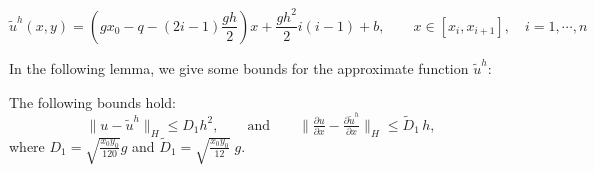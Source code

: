 \documentclass[axioms,article,submit,moreauthors]{Definitions/mdpi}
\newcommand\pder[2][]{\ensuremath{\tfrac{\partial#1}{\partial#2}}}
\begin{document}
\vspace{-12pt}

\centering 
\begin{equation}\label{uhtilde}
{\widetilde{u}^h}(x,y)=\left(gx_0-q-(2i-1)\frac{gh}{2} \right)x+\frac{gh^2}{2} i (i-1)+b,\qquad x\in [x_i,x_{i+1}], \quad i=1,\cdots,n
\end{equation}

In the following lemma, we give some bounds for the approximate  function ${\widetilde{u}^h}:$

 
  \begin{Lemma} \label{Cota u uh tilde} The following  bounds hold:
    		\[\lVert u-{\widetilde{u}^h} \rVert _H \leq  D_1 h^2, \qquad \text{and}\qquad
\lVert \pder[u]{x}-\pder[{\widetilde{u}^h}]{x} \rVert _H \leq \widetilde{D}_{1}\, h, \]
    		where $D_1=\sqrt{\frac{x_0 y_0 }{120}} g $ 
   and $\widetilde{D}_1=\sqrt{\frac{x_0 y_0}{12}}\; g$.
    
    \end{Lemma}
\end{document}
